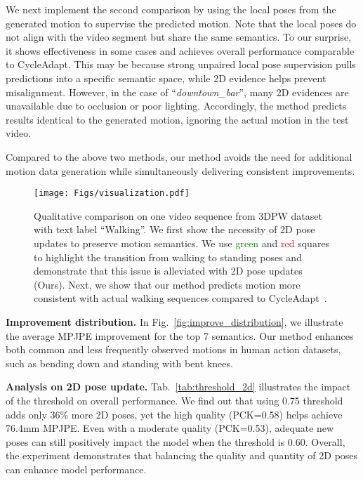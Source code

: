 We next implement the second comparison by using the local poses from the generated motion to supervise the predicted motion.
Note that the local poses do not align with the video segment but share the same semantics.
To our surprise, it shows effectiveness in some cases and achieves overall performance comparable to CycleAdapt.  
This may be because strong unpaired local pose supervision pulls predictions into a specific semantic space, while 2D evidence helps prevent misalignment.
However, in the case of ``\textit{downtown\_bar}'', many 2D evidences are unavailable due to occlusion or poor lighting.
Accordingly, the method predicts results identical to the generated motion, ignoring the actual motion in the test video. 

Compared to the above two methods, our method avoids the need for additional motion data generation while simultaneously delivering consistent improvements.  



\begin{figure*}[!t]
    \centering
        \texttt{[image: Figs/visualization.pdf]} 
    \caption{Qualitative comparison on one video sequence from 3DPW dataset~\cite{3dpw} with text label ``Walking''. We first show the necessity of 2D pose updates to preserve motion semantics. 
    We use \textcolor{green}{green} and \textcolor{red}{red} squares to highlight the transition from walking to standing poses and demonstrate that this issue is alleviated with 2D pose updates (Ours).
    Next, we show that our method predicts motion more consistent with actual walking sequences compared to  
    CycleAdapt~\cite{cycleadapt}. } 
    \label{fig:qualitative} 
     \vspace{-0.1in}
\end{figure*}

\noindent\textbf{Improvement distribution.} 
In Fig.~\ref{fig:improve_distribution}, we illustrate the average MPJPE improvement for the top 7 semantics. Our method enhances both common and less frequently observed motions in human action datasets, such as bending down and standing with bent knees.

\noindent\textbf{Analysis on 2D pose update.}
Tab.~\ref{tab:threshold_2d} illustrates the impact of the threshold on overall performance. 
We find out that using 0.75 threshold adds only 36\% more 2D poses, yet the high quality (PCK=0.58) helps achieve 76.4mm MPJPE.
Even with a moderate quality (PCK=0.53), adequate new poses can still positively impact the model when the threshold is 0.60. 
Overall, the experiment demonstrates that balancing the quality and quantity of 2D poses can enhance model performance.

